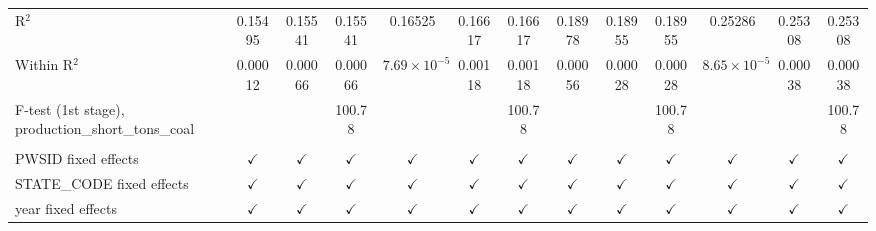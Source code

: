 \begin{table}[htbp]
\begin{adjustbox}{width = \textwidth, center}
\begin{tabular}{lcccccccccccc}
         R$^2$                                                & 0.15495                & 0.15541       & 0.15541               & 0.16525               & 0.16617        & 0.16617               & 0.18978               & 0.18955       & 0.18955               & 0.25286               & 0.25308       & 0.25308\\  
         Within R$^2$                                         & 0.00012                & 0.00066       & 0.00066               & $7.69\times 10^{-5}$  & 0.00118        & 0.00118               & 0.00056               & 0.00028       & 0.00028               & $8.65\times 10^{-5}$  & 0.00038       & 0.00038\\  
         F-test (1st stage), production\_short\_tons\_coal    &                        &               & 100.78                &                       &                & 100.78                &                       &               & 100.78                &                       &               & 100.78\\  
          \\
         PWSID fixed effects                                  & $\checkmark$           & $\checkmark$  & $\checkmark$          & $\checkmark$          & $\checkmark$   & $\checkmark$          & $\checkmark$          & $\checkmark$  & $\checkmark$          & $\checkmark$          & $\checkmark$  & $\checkmark$\\   
         STATE\_CODE fixed effects                            & $\checkmark$           & $\checkmark$  & $\checkmark$          & $\checkmark$          & $\checkmark$   & $\checkmark$          & $\checkmark$          & $\checkmark$  & $\checkmark$          & $\checkmark$          & $\checkmark$  & $\checkmark$\\   
         year fixed effects                                   & $\checkmark$           & $\checkmark$  & $\checkmark$          & $\checkmark$          & $\checkmark$   & $\checkmark$          & $\checkmark$          & $\checkmark$  & $\checkmark$          & $\checkmark$          & $\checkmark$  & $\checkmark$\\   
         \bottomrule
      \end{tabular}
   \end{adjustbox}
\end{table}


